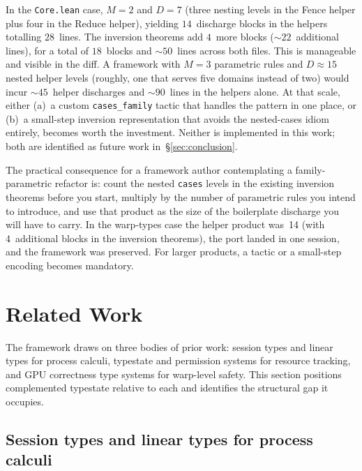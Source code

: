 \documentclass[acmsmall,screen,review,anonymous,nonacm]{acmart}
\begin{document}
In the \texttt{Core.lean} case, $M = 2$ and $D = 7$ (three nesting levels in the Fence helper plus four in the Reduce helper), yielding $14$~discharge blocks in the helpers totalling $28$~lines. The inversion theorems add $4$~more blocks (${\sim}22$~additional lines), for a total of $18$~blocks and ${\sim}50$~lines across both files. This is manageable and visible in the diff. A framework with $M = 3$ parametric rules and $D \approx 15$ nested helper levels (roughly, one that serves five domains instead of two) would incur ${\sim}45$~helper discharges and ${\sim}90$~lines in the helpers alone. At that scale, either (a)~a custom \texttt{cases\_family} tactic that handles the pattern in one place, or (b)~a small-step inversion representation that avoids the nested-cases idiom entirely, becomes worth the investment. Neither is implemented in this work; both are identified as future work in~\S\ref{sec:conclusion}.

The practical consequence for a framework author contemplating a family-parametric refactor is: count the nested \texttt{cases} levels in the existing inversion theorems before you start, multiply by the number of parametric rules you intend to introduce, and use that product as the size of the boilerplate discharge you will have to carry. In the warp-types case the helper product was~14 (with 4~additional blocks in the inversion theorems), the port landed in one session, and the framework was preserved. For larger products, a tactic or a small-step encoding becomes mandatory.


\section{Related Work}\label{sec:related}

The framework draws on three bodies of prior work: session types and linear types for process calculi, typestate and permission systems for resource tracking, and GPU correctness type systems for warp-level safety. This section positions complemented typestate relative to each and identifies the structural gap it occupies.

\subsection{Session types and linear types for process calculi}\label{sec:session-types}
\end{document}

